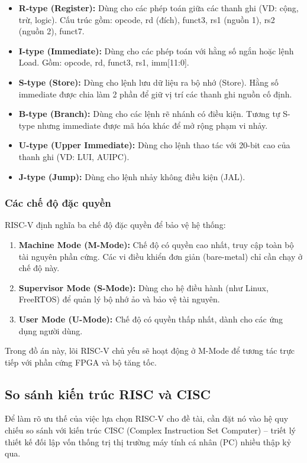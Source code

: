 \begin{itemize}
    \item \textbf{R-type (Register):} Dùng cho các phép toán giữa các thanh ghi (VD: cộng, trừ, logic). Cấu trúc gồm: opcode, rd (đích), funct3, rs1 (nguồn 1), rs2 (nguồn 2), funct7.
    \item \textbf{I-type (Immediate):} Dùng cho các phép toán với hằng số ngắn hoặc lệnh Load. Gồm: opcode, rd, funct3, rs1, imm[11:0].
    \item \textbf{S-type (Store):} Dùng cho lệnh lưu dữ liệu ra bộ nhớ (Store). Hằng số immediate được chia làm 2 phần để giữ vị trí các thanh ghi nguồn cố định.
    \item \textbf{B-type (Branch):} Dùng cho các lệnh rẽ nhánh có điều kiện. Tương tự S-type nhưng immediate được mã hóa khác để mở rộng phạm vi nhảy.
    \item \textbf{U-type (Upper Immediate):} Dùng cho lệnh thao tác với 20-bit cao của thanh ghi (VD: LUI, AUIPC).
    \item \textbf{J-type (Jump):} Dùng cho lệnh nhảy không điều kiện (JAL).
\end{itemize}


\subsubsection{Các chế độ đặc quyền}
RISC-V định nghĩa ba chế độ đặc quyền để bảo vệ hệ thống:
\begin{enumerate}
    \item \textbf{Machine Mode (M-Mode):} Chế độ có quyền cao nhất, truy cập toàn bộ tài nguyên phần cứng. Các vi điều khiển đơn giản (bare-metal) chỉ cần chạy ở chế độ này.
    \item \textbf{Supervisor Mode (S-Mode):} Dùng cho hệ điều hành (như Linux, FreeRTOS) để quản lý bộ nhớ ảo và bảo vệ tài nguyên.
    \item \textbf{User Mode (U-Mode):} Chế độ có quyền thấp nhất, dành cho các ứng dụng người dùng.
\end{enumerate}
Trong đồ án này, lõi RISC-V chủ yếu sẽ hoạt động ở M-Mode để tương tác trực tiếp với phần cứng FPGA và bộ tăng tốc.


\subsection{So sánh kiến trúc RISC và CISC}

Để làm rõ ưu thế của việc lựa chọn RISC-V cho đề tài, cần đặt nó vào hệ quy chiếu so sánh với kiến trúc CISC (Complex Instruction Set Computer) – triết lý thiết kế đối lập vốn thống trị thị trường máy tính cá nhân (PC) nhiều thập kỷ qua.

